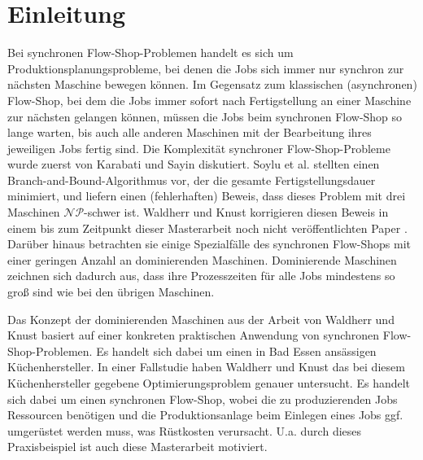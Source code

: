 \documentclass{scrreprt}
\begin{document}
\tableofcontents

\chapter{Einleitung}
Bei synchronen Flow-Shop-Problemen handelt es sich um Produktions\-planungs\-probleme,
bei denen die Jobs sich immer nur synchron zur nächsten Maschine bewegen können.
Im Gegensatz zum klassischen (asynchronen) Flow-Shop, bei dem die Jobs immer sofort nach Fertigstellung an einer Maschine zur nächsten gelangen können,
müssen die Jobs beim synchronen Flow-Shop so lange warten, bis auch alle anderen Maschinen mit der Bearbeitung ihres jeweiligen Jobs fertig sind.
Die Komplexität synchroner Flow-Shop-Probleme wurde zuerst von Karabati und Sayin \cite{karabati} diskutiert.
Soylu et al. \cite{soylu} stellten einen Branch-and-Bound-Algorithmus vor, der die gesamte Fertigstellungsdauer minimiert, und liefern einen (fehlerhaften) Beweis, 
dass dieses Problem mit drei Maschinen $\mathcal{NP}$-schwer ist.
Waldherr und Knust korrigieren diesen Beweis in einem bis zum Zeitpunkt dieser Masterarbeit noch nicht veröffentlichten Paper \cite{preprint}.
Darüber hinaus betrachten sie einige Spezialfälle des synchronen Flow-Shops mit einer geringen Anzahl an dominierenden Maschinen.
Dominierende Maschinen zeichnen sich dadurch aus, dass ihre Prozesszeiten für alle Jobs mindestens so groß sind wie bei den übrigen Maschinen.

Das Konzept der dominierenden Maschinen aus der Arbeit von Waldherr und Knust basiert auf einer konkreten praktischen Anwendung von synchronen Flow-Shop-Pro\-ble\-men.
Es handelt sich dabei um einen in Bad Essen ansässigen Küchenhersteller.
In einer Fallstudie \cite{casestudy} haben Waldherr und Knust das bei diesem Küchenhersteller gegebene Optimierungsproblem genauer untersucht.
Es handelt sich dabei um einen synchronen Flow-Shop, wobei die zu produzierenden Jobs Ressourcen benötigen und die Produktionsanlage beim Einlegen eines Jobs
ggf. umgerüstet werden muss, was Rüstkosten verursacht.
U.a. durch dieses Praxisbeispiel ist auch diese Masterarbeit motiviert.
\end{document}

